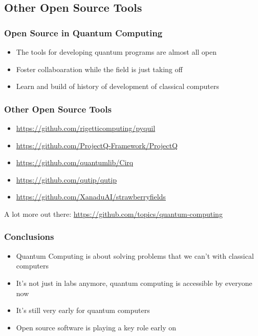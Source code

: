 \documentclass[aspectratio=169,11pt,hyperref={colorlinks=true}]{beamer}
\begin{document}
\subsection{Other Open Source Tools}
\begin{frame}
    \frametitle{Open Source in Quantum Computing}
    \begin{itemize}
        \item The tools for developing quantum programs are almost all open
        \item Foster collaboaration while the field is just taking off
        \item Learn and build of history of development of classical computers
    \end{itemize}
\end{frame}

\begin{frame}
    \frametitle{Other Open Source Tools}
    \begin{itemize}
        \item \href{https://github.com/rigetticomputing/pyquil}{https://github.com/rigetticomputing/pyquil}
        \item \href{https://github.com/ProjectQ-Framework/ProjectQ}{https://github.com/ProjectQ-Framework/ProjectQ}
        \item \href{https://github.com/quantumlib/Cirq}{https://github.com/quantumlib/Cirq}
        \item \href{https://github.com/qutip/qutip}{https://github.com/qutip/qutip}
        \item \href{https://github.com/XanaduAI/strawberryfields}{https://github.com/XanaduAI/strawberryfields}
    \end{itemize}
    A lot more out there:
    \href{https://github.com/topics/quantum-computing}{https://github.com/topics/quantum-computing}
\end{frame}

\begin{frame}
    \frametitle{Conclusions}
    \begin{itemize}
        \item Quantum Computing is about solving problems that we can't with
            classical computers
        \item It's not just in labs anymore, quantum computing is accessible by
            everyone now
        \item It's still very early for quantum computers
        \item Open source software is playing a key role early on
    \end{itemize}
\end{frame}
\end{document}
